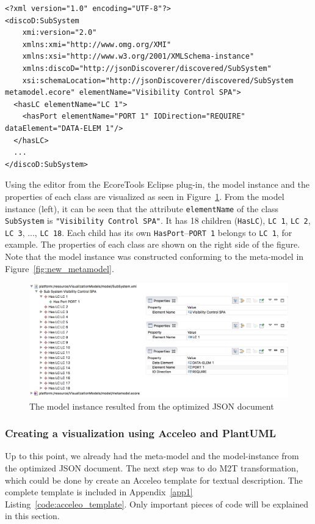 \begin{lstlisting}[caption=Data model or model instance discovered by JSON discoverer,label=code:model_instance_xmi]
<?xml version="1.0" encoding="UTF-8"?>
<discoD:SubSystem
    xmi:version="2.0"
    xmlns:xmi="http://www.omg.org/XMI"
    xmlns:xsi="http://www.w3.org/2001/XMLSchema-instance"
    xmlns:discoD="http://jsonDiscoverer/discovered/SubSystem"
    xsi:schemaLocation="http://jsonDiscoverer/discovered/SubSystem metamodel.ecore" elementName="Visibility Control SPA">
  <hasLC elementName="LC 1">
    <hasPort elementName="PORT 1" IODirection="REQUIRE" dataElement="DATA-ELEM 1"/>
  </hasLC>
  ...
</discoD:SubSystem>
\end{lstlisting}

Using the editor from the EcoreTools Eclipse plug-in, the model instance and the properties of each class are visualized as seen in Figure~\ref{fig:new_model_instance}. From the model instance (left), it can be seen that the attribute \texttt{elementName} of the class \texttt{SubSystem} is \texttt{"Visibility Control SPA"}. It has 18 children (\texttt{HasLC}), \texttt{LC 1}, \texttt{LC 2}, \texttt{LC 3}, ..., \texttt{LC 18}. Each child has its own \texttt{HasPort}--\texttt{PORT 1} belongs to \texttt{LC 1}, for example. The properties of each class are shown on the right side of the figure. Note that the model instance was constructed conforming to the meta-model in Figure~\ref{fig:new_metamodel}.

\begin{figure}[H]
\centering
\captionsetup{justification=centering}
\vspace{0cm}%
\includegraphics[width=0.95\linewidth]{figure/new_model/new_model_instance.png}
\caption{The model instance resulted from the optimized JSON document}
\label{fig:new_model_instance}
\end{figure}

\subsubsection{Creating a visualization using Acceleo and PlantUML}
Up to this point, we already had the meta-model and the model-instance from the optimized JSON document. The next step was to do M2T transformation, which could be done by create an Acceleo template for textual description. The complete template is included in Appendix~\ref{app1} Listing~\ref{code:acceleo_template}. Only important pieces of code will be explained in this section.\\

